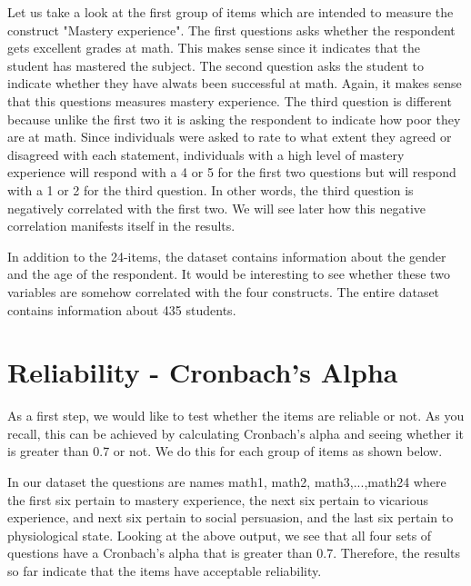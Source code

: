 \documentclass[a4paper,12pt,oneside]{book}
\begin{document}
Let us take a look at the first group of items which are intended to measure the construct "Mastery experience". The first questions asks whether the
respondent gets excellent grades at math. This makes sense since it indicates that the student has mastered the subject. The second question asks
the student to indicate whether they have alwats been successful at math. Again, it makes sense that this questions measures mastery experience.
The third question is different because unlike the first two it is asking the respondent to indicate how poor they are at math. Since individuals
were asked to rate to what extent they agreed or disagreed with each statement, individuals with a high level of mastery experience will respond with
a 4 or 5 for the first two questions but will respond with a 1 or 2 for the third question. In other words, the third question is negatively
correlated with the first two. We will see later how this negative correlation manifests itself in the results. 

In addition to the 24-items, the dataset contains information about the gender and the age of the respondent. It would be interesting to see whether
these two variables are somehow correlated with the four constructs. The entire dataset contains information about 435 students.

\section{Reliability - Cronbach's Alpha}
As a first step, we would like to test whether the items are reliable or not. As you recall, this can be achieved by calculating Cronbach's alpha
and seeing whether it is greater than 0.7 or not. We do this for each group of items as shown below. 

\begin{stlog}\end{stlog}

In our dataset the questions are names math1, math2, math3,...,math24 where the first six pertain to mastery experience, the next six pertain to
vicarious experience, and next six pertain to social persuasion, and the last six pertain to physiological state. Looking at the above
output, we see that all four sets of questions have a Cronbach's alpha that is greater than 0.7. Therefore, the results so far indicate that the
items have acceptable reliability.
\end{document}

